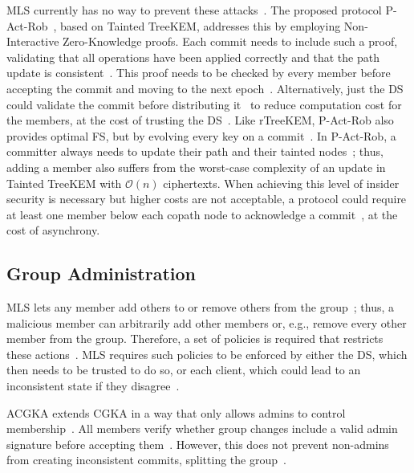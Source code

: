 \documentclass[conference]{IEEEtran}
\begin{document}
\ac{MLS} currently has no way to prevent these attacks~\cite{alwenInsiderSecurityMLS2022,barnesMessagingLayerSecurity2023}.
The proposed protocol P-Act-Rob~\cite{alwenContinuousGroupKey2020}, based on Tainted TreeKEM, addresses this by employing Non-Interactive Zero-Knowledge proofs.
Each commit needs to include such a proof, validating that all operations have been applied correctly and that the path update is consistent~\cite{alwenContinuousGroupKey2020}.
This proof needs to be checked by every member before accepting the commit and moving to the next epoch~\cite{alwenContinuousGroupKey2020}.
Alternatively, just the \ac{DS} could validate the commit before distributing it~\cite{devigneMLSGroupMessaging2021} to reduce computation cost for the members, at the cost of trusting the \ac{DS}~\cite{alwenInsiderSecurityMLS2022}.
Like rTreeKEM, P-Act-Rob also provides optimal \ac{FS}, but by evolving every key on a commit~\cite{alwenContinuousGroupKey2020}.
In P-Act-Rob, a committer always needs to update their path and their tainted nodes~\cite{alwenContinuousGroupKey2020}; thus, adding a member also suffers from the worst-case complexity of an update in Tainted TreeKEM with $\mathcal{O}(n)$ ciphertexts.
When achieving this level of insider security is necessary but higher costs are not acceptable, a protocol could require at least one member below each copath node to acknowledge a commit~\cite{barnesMessagingLayerSecurity2023}, at the cost of asynchrony.

\subsection{Group Administration}
\ac{MLS} lets any member add others to or remove others from the group~\cite{barnesMessagingLayerSecurity2023}; thus, a malicious member can arbitrarily add other members or, e.g., remove every other member from the group.
Therefore, a set of policies is required that restricts these actions~\cite{beurdoucheMessagingLayerSecurity2025}.
\ac{MLS} requires such policies to be enforced by either the \ac{DS}, which then needs to be trusted to do so, or each client, which could lead to an inconsistent state if they disagree~\cite{beurdoucheMessagingLayerSecurity2025}.

\ac{ACGKA} extends \ac{CGKA} in a way that only allows admins to control membership~\cite{balbasCryptographicAdministrationSecure}.
All members verify whether group changes include a valid admin signature before accepting them~\cite{balbasCryptographicAdministrationSecure}.
However, this does not prevent non-admins from creating inconsistent commits, splitting the group~\cite{balbasCryptographicAdministrationSecure}.
\end{document}
